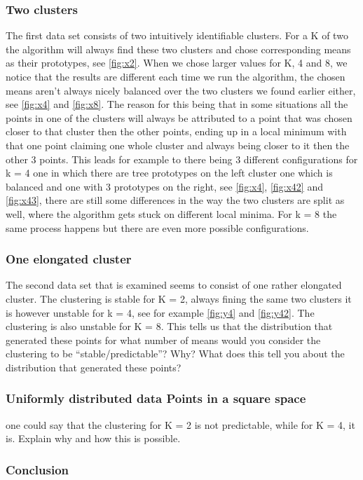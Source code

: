 \documentclass[10pt,a4paper]{article}
\begin{document}
\subsubsection{Two clusters	}
The first data set consists of two intuitively identifiable clusters. For a K of two the algorithm will always find these two clusters and chose corresponding means as their prototypes, see \ref{fig:x2}. 
When we chose larger values for K, 4 and 8, we notice that the results are different each time we run the algorithm, the chosen means aren't always nicely balanced over the two clusters we found earlier either, see \ref{fig:x4} and \ref{fig:x8}. The reason for this being that in some situations all the points in one of the clusters will always be attributed to a point that was chosen  closer to that cluster then the other points, ending up in a local minimum with that one point claiming one whole cluster and always being closer to it then the other 3 points. 
This leads for example to there being 3 different configurations for k = 4 one in which there are tree prototypes on the left cluster one which is balanced and one with 3 prototypes on the right, see \ref{fig:x4}, \ref{fig:x42} and \ref{fig:x43}, there are still some differences in the way the two clusters are split as well, where the algorithm gets stuck on different local minima. For k = 8 the same process happens but there are even more possible configurations.
\subsubsection{One elongated cluster}
The second data set that is examined seems to consist of one rather elongated cluster. The clustering is stable for K = 2, always fining the same two clusters it is however unstable for k = 4, see for example \ref{fig:y4} and \ref{fig:y42}. The clustering is also unstable for K = 8. This tells us that the distribution that generated these points 
for what number of means would you consider the clustering to be
“stable/predictable”? Why? What does this tell you about the distribution that
generated these points?
\subsubsection{Uniformly distributed data Points in a square space}

one could say that the clustering for K = 2 is not predictable,
while for K = 4, it is. Explain why and how this is possible.
\subsubsection{Conclusion}
\end{document}
